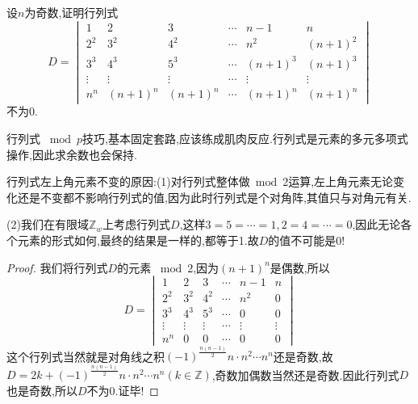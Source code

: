 \documentclass[../../main.tex]{subfiles}
\begin{document}
\begin{example}
设\( n \)为奇数,证明行列式
\[
D = \begin{vmatrix}
1 & 2 & 3 & \cdots & n-1 & n \\
2^2 & 3^2 & 4^2 & \cdots & n^2 & (n+1)^2 \\
3^3 & 4^3 & 5^3 & \cdots & (n+1)^3 & (n+1)^3 \\
\vdots & \vdots & \vdots & \cdots & \vdots & \vdots \\
n^n & (n+1)^n & (n+1)^n & \cdots & (n+1)^n & (n+1)^n
\end{vmatrix}
\]
不为0.
\end{example}
\begin{note}
行列式 \(\bmod p\)技巧,基本固定套路,应该练成肌肉反应.行列式是元素的多元多项式操作,因此求余数也会保持.
\end{note}
\begin{remark}
行列式左上角元素不变的原因:(1)对行列式整体做$\bmod 2$运算,左上角元素无论变化还是不变都不影响行列式的值,因为此时行列式是个对角阵,其值只与对角元有关.

(2)我们在有限域\( \mathbb{Z}_w \)上考虑行列式\( D \),这样$3=5=\cdots =1,2=4=\cdots =0$,因此无论各个元素的形式如何,最终的结果是一样的,都等于1.故$D$的值不可能是0!
\end{remark}
\begin{proof}
我们将行列式\( D \)的元素 \(\bmod 2\),因为\( (n+1)^n \)是偶数,所以
\[
D = \begin{vmatrix}
1 & 2 & 3 & \cdots & n-1 & n \\
2^2 & 3^2 & 4^2 & \cdots & n^2 & 0 \\
3^3 & 4^3 & 5^3 & \cdots & 0 & 0 \\
\vdots & \vdots & \vdots & \cdots & \vdots & \vdots \\
n^n & 0 & 0 & \cdots & 0 & 0
\end{vmatrix}
\]
这个行列式当然就是对角线之积\(\left( -1 \right) ^{\frac{n\left( n-1 \right)}{2}}n\cdot n^2\cdots n^n\)还是奇数,故$D=2k+\left( -1 \right) ^{\frac{n\left( n-1 \right)}{2}}n\cdot n^2\cdots n^n(k\in \mathbb{Z})$,奇数加偶数当然还是奇数.因此行列式\( D \)也是奇数,所以\( D \)不为0.证毕!
\end{proof}
\end{document}
